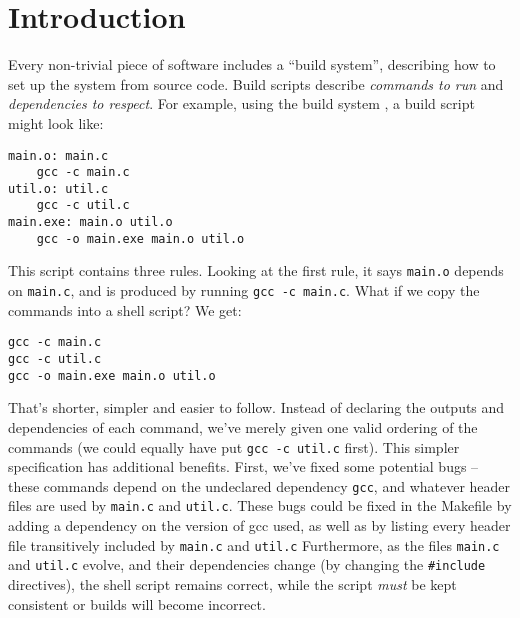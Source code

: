 \section{Introduction}
\label{sec:introduction}


Every non-trivial piece of software includes a ``build system'', describing how to set up the system from source code.
Build scripts \cite{build_systems_a_la_carte} describe \emph{commands to run} and \emph{dependencies to respect}. For example, using the \Make build system \cite{make}, a build script might look like:

\vspace{3mm}
\begin{small}
\begin{verbatim}
main.o: main.c
    gcc -c main.c
util.o: util.c
    gcc -c util.c
main.exe: main.o util.o
    gcc -o main.exe main.o util.o
\end{verbatim}
\end{small}
\vspace{3mm}

This script contains three rules. Looking at the first rule, it says \texttt{main.o} depends on \texttt{main.c}, and is produced by running \texttt{gcc -c main.c}. What if we copy the commands into a shell script? We get:

\vspace{3mm}
\begin{small}
\begin{verbatim}
gcc -c main.c
gcc -c util.c
gcc -o main.exe main.o util.o
\end{verbatim}
\end{small}
\vspace{3mm}

That's shorter, simpler and easier to follow. Instead of declaring the outputs and dependencies of each command, we've merely given one valid ordering of the commands (we could equally have put \texttt{gcc -c util.c} first). This simpler specification has additional benefits. First, we've fixed some potential bugs -- these commands depend on the undeclared dependency \texttt{gcc}, and whatever header files are used by \texttt{main.c} and \texttt{util.c}.  These bugs could be fixed in the Makefile by adding a dependency on the version of gcc used, as well as by listing every header file transitively included by \texttt{main.c} and \texttt{util.c}
Furthermore, as the files \texttt{main.c} and \texttt{util.c} evolve, and their dependencies change (by changing the \texttt{\#include} directives), the shell script remains correct, while the \Make script \emph{must} be kept consistent or builds will become incorrect.

